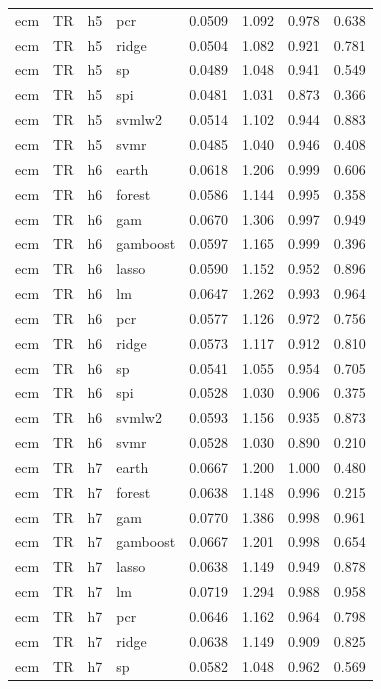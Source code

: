 \begin{ThreePartTable}
\begin{longtable}[t]{llclcccc}
ecm & TR & h5 & pcr & 0.0509 & 1.092 & 0.978 & 0.638\\
ecm & TR & h5 & ridge & 0.0504 & 1.082 & 0.921 & 0.781\\
ecm & TR & h5 & sp & 0.0489 & 1.048 & 0.941 & 0.549\\
ecm & TR & h5 & spi & 0.0481 & 1.031 & 0.873 & 0.366\\
ecm & TR & h5 & svmlw2 & 0.0514 & 1.102 & 0.944 & 0.883\\
ecm & TR & h5 & svmr & 0.0485 & 1.040 & 0.946 & 0.408\\
\addlinespace
ecm & TR & h6 & earth & 0.0618 & 1.206 & 0.999 & 0.606\\
ecm & TR & h6 & forest & 0.0586 & 1.144 & 0.995 & 0.358\\
ecm & TR & h6 & gam & 0.0670 & 1.306 & 0.997 & 0.949\\
ecm & TR & h6 & gamboost & 0.0597 & 1.165 & 0.999 & 0.396\\
ecm & TR & h6 & lasso & 0.0590 & 1.152 & 0.952 & 0.896\\
ecm & TR & h6 & lm & 0.0647 & 1.262 & 0.993 & 0.964\\
ecm & TR & h6 & pcr & 0.0577 & 1.126 & 0.972 & 0.756\\
ecm & TR & h6 & ridge & 0.0573 & 1.117 & 0.912 & 0.810\\
ecm & TR & h6 & sp & 0.0541 & 1.055 & 0.954 & 0.705\\
ecm & TR & h6 & spi & 0.0528 & 1.030 & 0.906 & 0.375\\
ecm & TR & h6 & svmlw2 & 0.0593 & 1.156 & 0.935 & 0.873\\
ecm & TR & h6 & svmr & 0.0528 & 1.030 & 0.890 & 0.210\\
\addlinespace
ecm & TR & h7 & earth & 0.0667 & 1.200 & 1.000 & 0.480\\
ecm & TR & h7 & forest & 0.0638 & 1.148 & 0.996 & 0.215\\
ecm & TR & h7 & gam & 0.0770 & 1.386 & 0.998 & 0.961\\
ecm & TR & h7 & gamboost & 0.0667 & 1.201 & 0.998 & 0.654\\
ecm & TR & h7 & lasso & 0.0638 & 1.149 & 0.949 & 0.878\\
ecm & TR & h7 & lm & 0.0719 & 1.294 & 0.988 & 0.958\\
ecm & TR & h7 & pcr & 0.0646 & 1.162 & 0.964 & 0.798\\
ecm & TR & h7 & ridge & 0.0638 & 1.149 & 0.909 & 0.825\\
ecm & TR & h7 & sp & 0.0582 & 1.048 & 0.962 & 0.569\\

\end{longtable}
\end{ThreePartTable}
